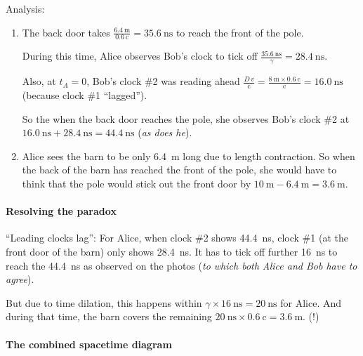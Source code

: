 \documentclass[pagesize,headsepline,10pt,parskip=half]{scrreprt}
\newcommand{\const}[1]{\ensuremath{\mathrm{#1}}}
\renewcommand{\c}{\const{c}}
\begin{document}
        Analysis:
        \begin{enumerate}
          \item
            The back door takes
            $\frac{\SI{6.4}{\meter}}{\SI{0.6}{\c}} = \SI{35.6}{\nano\second}$
            to reach the front of the pole.

            During this time, Alice observes Bob's clock to tick off
            $\frac{\SI{35.6}{\nano\second}}{\gamma} = \SI{28.4}{\nano\second}$.

            Also, at $t_A = 0$, Bob's clock \#2 was reading ahead
            $\frac{D \, v}{\c} = \frac{\SI{8}{\meter} \times \SI{0.6}{\c}}{\c}
            = \SI{16.0}{\nano\second}$ (because clock \#1 ``lagged'').

            So the when the back door reaches the pole, she observes Bob's
            clock \#2 at $\SI{16.0}{\nano\second} + \SI{28.4}{\nano\second}
            = \SI{44.4}{\nano\second}$ (\emph{as does he}).

          \item
            Alice sees the barn to be only \SI{6.4}{\meter} long due to length
            contraction.  So when the back of the barn has reached the front
            of the pole, she would have to think that the pole would stick out
            the front door by
            $\SI{10}{\meter} - \SI{6.4}{\meter} = \SI{3.6}{\meter}$.
        \end{enumerate}

      \paragraph{Resolving the paradox}
        ``Leading clocks lag'': For Alice, when clock \#2 shows
        \SI{44.4}{\nano\second}, clock \#1 (at the front door of the barn) only
        shows \SI{28.4}{\nano\second}.  It has to tick off further
        \SI{16}{\nano\second} to reach the \SI{44.4}{\nano\second} as observed
        on the photos (\emph{to which both Alice and Bob have to agree}).

        But due to time dilation, this happens within
        $\gamma \times \SI{16}{\nano\second} = \SI{20}{\nano\second}$
        for Alice.  And during that time, the barn covers the remaining
        $\SI{20}{\nano\second} \times \SI{0.6}{\c} = \SI{3.6}{\meter}$. (!)

      \paragraph{The combined spacetime diagram}
\end{document}

